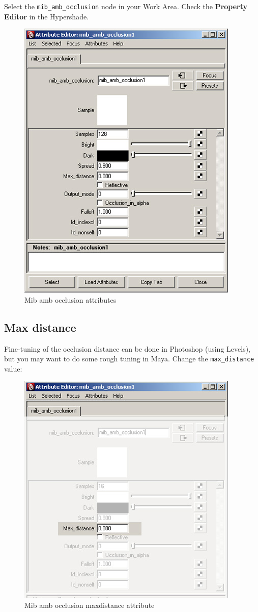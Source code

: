 \documentclass[10pt,a4paper]{article}
\begin{document}
Select the \lstinline{mib_amb_occlusion} node in your Work Area. Check the \textbf{Property Editor} in the Hypershade.

\begin{figure}[tbh]
\centering
\includegraphics[width=0.5\linewidth]{figure/Mib_amb_occlusion_attributes}
\caption{Mib amb occlusion attributes}
\label{fig:mibambocclusionattributes}
\end{figure}

\subsection{Max distance}
Fine-tuning of the occlusion distance can be done in Photoshop (using Levels), but you may want to do some rough tuning in Maya.
Change the \lstinline{max_distance} value:

\begin{figure}[tbh]
\centering
\includegraphics[width=0.5\linewidth]{figure/Mib_amb_occlusion_maxdistance_attribute}
\caption{Mib amb occlusion maxdistance attribute}
\label{fig:mibambocclusionmaxdistanceattribute}
\end{figure}
\end{document}
